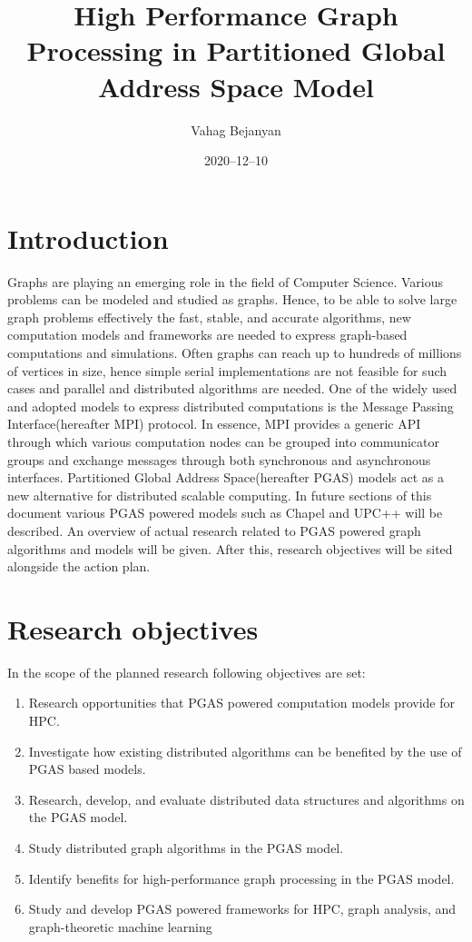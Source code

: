 \documentclass[14pt]{extreport}
\title{High Performance Graph Processing in Partitioned Global Address Space Model}
\date{2020--12--10}
\author{Vahag Bejanyan}
\newcommand\blankpage{
    \null
    \thispagestyle{empty}
    \newpage
    }
\begin{document}
\maketitle
{}
\newpage
{}

\tableofcontents
\blankpage

\section{Introduction}
Graphs are playing an emerging role in the field of Computer Science. Various problems can be modeled and studied as graphs\cite{fouss_saerens_shimbo_2016}. Hence, to be able to solve large graph problems effectively the fast, stable, and accurate algorithms, new computation models and frameworks are needed to express graph-based computations and simulations. Often graphs can reach up to hundreds of millions of vertices in size, hence simple serial implementations are not feasible for such cases and parallel and distributed algorithms are needed. One of the widely used and adopted models to express distributed computations is the Message Passing Interface(hereafter MPI) protocol. In essence, MPI provides a generic API through which various computation nodes can be grouped into communicator groups and exchange messages through both synchronous and asynchronous interfaces. Partitioned Global Address Space(hereafter PGAS) models act as a new alternative for distributed scalable computing. In future sections of this document various PGAS powered models such as Chapel and UPC++ will be described. An overview of actual research related to PGAS powered graph algorithms and models will be given. After this, research objectives will be sited alongside the action plan.

\blankpage
\section{Research objectives}
In the scope of the planned research following objectives are set:

\begin{enumerate}
	\item Research opportunities that PGAS powered computation models provide for HPC.
	\item Investigate how existing distributed algorithms can be benefited by the use of PGAS based models.
	\item Research, develop, and evaluate distributed data structures and algorithms on the PGAS model.
	\item Study distributed graph algorithms in the PGAS model.
	\item Identify benefits for high-performance graph processing in the PGAS model.
	\item Study and develop PGAS powered frameworks for HPC, graph analysis, and graph-theoretic machine learning
\end{enumerate}
\end{document}
